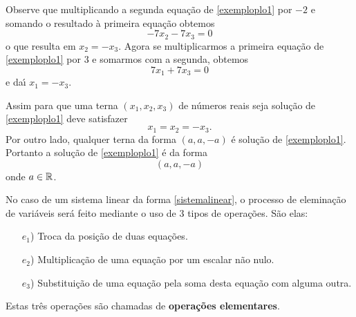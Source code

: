 Observe que multiplicando a segunda equa\c{c}\~ao de \eqref{exemploplo1} por $-2$ e somando o resultado \`a primeira equa\c{c}\~ao obtemos
\[
	-7x_2 - 7x_3 = 0
\]
o que resulta em $x_2 = -x_3$. Agora se multiplicarmos a primeira equa\c{c}\~ao de \eqref{exemploplo1} por $3$ e somarmos com a segunda, obtemos
\[
	7x_1 + 7x_3 = 0
\]
e da{\'\i} $x_1 = -x_3$.

Assim para que uma terna $(x_1, x_2, x_3)$ de n\'umeros reais seja solu\c{c}\~ao de \eqref{exemploplo1} deve satisfazer
\[
	x_1 = x_2 = -x_3.
\]
Por outro lado, qualquer terna da forma $(a, a, -a)$ \'e solu\c{c}\~ao de \eqref{exemploplo1}. Portanto a solu\c{c}\~ao de \eqref{exemploplo1} \'e da forma
\[
	(a, a, -a)
\]
onde $a \in \mathbb{R}$.

No caso de um sistema linear da forma \eqref{sistemalinear}, o processo de elemina\c{c}\~ao de vari\'aveis ser\'a feito mediante o uso de 3 tipos de opera\c{c}\~oes. S\~ao elas:
\begin{itemize}
	\item[$e_1$)] Troca da posi\c{c}\~ao de duas equa\c{c}\~oes.
	\item[$e_2$)] Multiplica\c{c}\~ao de uma equa\c{c}\~ao por um escalar n\~ao nulo.
	\item[$e_3$)] Substitui\c{c}\~ao de uma equa\c{c}\~ao pela soma desta equa\c{c}\~ao com alguma outra.
\end{itemize}

Estas tr\^es opera\c{c}\~oes s\~ao chamadas de \textbf{opera\c{c}\~oes elementares}.

